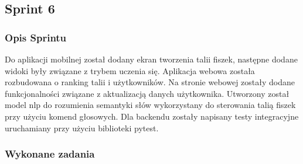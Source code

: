 \subsection{Sprint 6}

\subsubsection{Opis Sprintu}

Do aplikacji mobilnej został dodany ekran tworzenia talii fiszek, następne dodane widoki były związane z trybem uczenia się. Aplikacja webowa została rozbudowana o ranking talii i użytkowników. Na stronie webowej zostały dodane funkcjonalności związane z aktualizacją danych użytkownika. Utworzony został model nlp do rozumienia semantyki słów wykorzystany do sterowania talią fiszek przy użyciu komend głosowych. Dla backendu zostały napisany testy integracyjne uruchamiany przy użyciu biblioteki pytest.

\subsubsection{Wykonane zadania}

